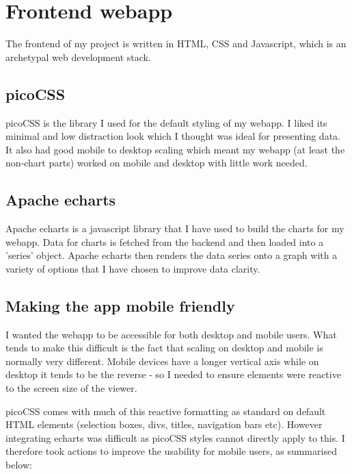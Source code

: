 \section{Frontend webapp}\label{sec:front-end}

The frontend of my project is written in HTML, CSS and Javascript, which is an
archetypal web development stack.

\subsection{picoCSS}

picoCSS is the library I used for the default styling of my webapp. I liked its
minimal and low distraction look which I thought was ideal for presenting data.
It also had good mobile to desktop scaling which meant my webapp (at least the
non-chart parts) worked on mobile and desktop with little work needed.

\subsection{Apache echarts}

Apache echarts is a javascript library that I have used to build the charts for
my webapp. Data for charts is fetched from the backend and then loaded into a
'series' object. Apache echarts then renders the data series onto a graph with a
variety of options that I have chosen to improve data clarity.

\subsection{Making the app mobile friendly}

I wanted the webapp to be accessible for both desktop and mobile users. What
tends to make this difficult is the fact that scaling on desktop and mobile is
normally very different. Mobile devices have a longer vertical axis while on
desktop it tends to be the reverse - so I needed to ensure elements were
reactive to the screen size of the viewer.

picoCSS comes with much of this reactive formatting as standard on default HTML
elements (selection boxes, divs, titles, navigation bars etc). However
integrating echarts was difficult as picoCSS styles cannot directly apply to
this. I therefore took actions to improve the usability for mobile users, as
summarised below:

